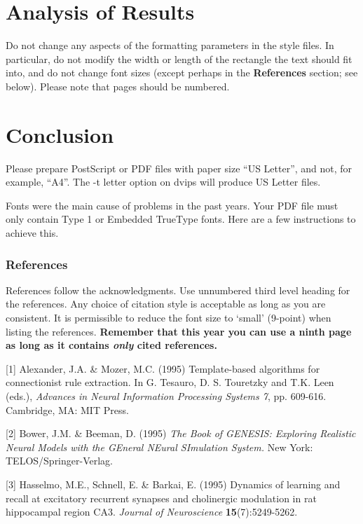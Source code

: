 \documentclass{article} %
\begin{document}
\section{Analysis of Results}
Do not change any aspects of the formatting parameters in the style files.
In particular, do not modify the width or length of the rectangle the text
should fit into, and do not change font sizes (except perhaps in the
\textbf{References} section; see below). Please note that pages should be
numbered.

\section{Conclusion}

Please prepare PostScript or PDF files with paper size ``US Letter'', and
not, for example, ``A4''. The -t
letter option on dvips will produce US Letter files.

Fonts were the main cause of problems in the past years. Your PDF file must
only contain Type 1 or Embedded TrueType fonts. Here are a few instructions
to achieve this.

\subsubsection*{References}

References follow the acknowledgments. Use unnumbered third level heading for
the references. Any choice of citation style is acceptable as long as you are
consistent. It is permissible to reduce the font size to `small' (9-point) 
when listing the references. {\bf Remember that this year you can use
a ninth page as long as it contains \emph{only} cited references.}

\small{
[1] Alexander, J.A. \& Mozer, M.C. (1995) Template-based algorithms
for connectionist rule extraction. In G. Tesauro, D. S. Touretzky
and T.K. Leen (eds.), {\it Advances in Neural Information Processing
Systems 7}, pp. 609-616. Cambridge, MA: MIT Press.

[2] Bower, J.M. \& Beeman, D. (1995) {\it The Book of GENESIS: Exploring
Realistic Neural Models with the GEneral NEural SImulation System.}
New York: TELOS/Springer-Verlag.

[3] Hasselmo, M.E., Schnell, E. \& Barkai, E. (1995) Dynamics of learning
and recall at excitatory recurrent synapses and cholinergic modulation
in rat hippocampal region CA3. {\it Journal of Neuroscience}
{\bf 15}(7):5249-5262.
}
\nocite{*}


\end{document}
